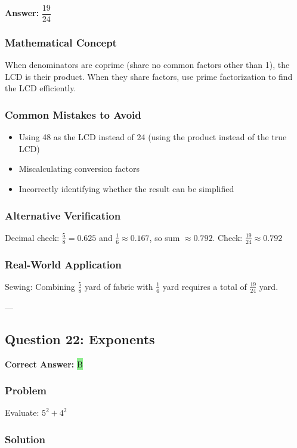 \documentclass[12pt]{article}
\begin{document}
\textbf{Answer: } $\dfrac{19}{24}$

\subsubsection*{Mathematical Concept}
When denominators are coprime (share no common factors other than 1), the LCD is their product. When they share factors, use prime factorization to find the LCD efficiently.

\subsubsection*{Common Mistakes to Avoid}
\begin{itemize}
\item Using 48 as the LCD instead of 24 (using the product instead of the true LCD)
\item Miscalculating conversion factors
\item Incorrectly identifying whether the result can be simplified
\end{itemize}

\subsubsection*{Alternative Verification}
Decimal check: $\frac{5}{8} = 0.625$ and $\frac{1}{6} \approx 0.167$, so sum $\approx 0.792$. Check: $\frac{19}{24} \approx 0.792$ 

\subsubsection*{Real-World Application}
Sewing: Combining $\frac{5}{8}$ yard of fabric with $\frac{1}{6}$ yard requires a total of $\frac{19}{24}$ yard.

---

\subsection{Question 22: Exponents}

\textbf{Correct Answer: } \colorbox{lightgreen}{B}

\subsubsection*{Problem}
Evaluate: $5^2 + 4^2$

\subsubsection*{Solution}
\end{document}

